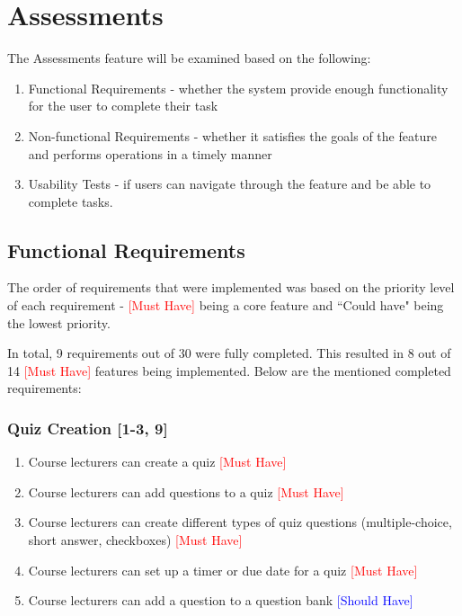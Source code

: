 \section{Assessments}

The Assessments feature will be examined based on the following:
\begin{enumerate}
	\item Functional Requirements - whether the system provide enough functionality for the user to complete their task
	\item Non-functional Requirements - whether it satisfies the goals of the feature and performs operations in a timely manner
	\item Usability Tests - if users can navigate through the feature and be able to complete tasks.
\end{enumerate}

\subsection{Functional Requirements}
The order of requirements that were implemented was based on the priority level of each requirement - \textcolor{Red}{[Must Have]} being a core feature and ``Could have" being the lowest priority. 

In total, 9 requirements out of 30 were fully completed. This resulted in 8 out of 14 \textcolor{Red}{[Must Have]} features being implemented. Below are the mentioned completed requirements:

\subsubsection{Quiz Creation [1-3, 9]}
\begin{enumerate}
	\item Course lecturers can create a quiz \textcolor{Red}{[Must Have]}
	\item Course lecturers can add questions to a quiz \textcolor{Red}{[Must Have]}
	\item Course lecturers can create different types of quiz questions (multiple-choice, short answer, checkboxes) \textcolor{Red}{[Must Have]}
	\item Course lecturers can set up a timer or due date for a quiz \textcolor{Red}{[Must Have]}
		\item Course lecturers can add a question to a question bank \textcolor{Blue}{[Should Have]}
\end{enumerate}

